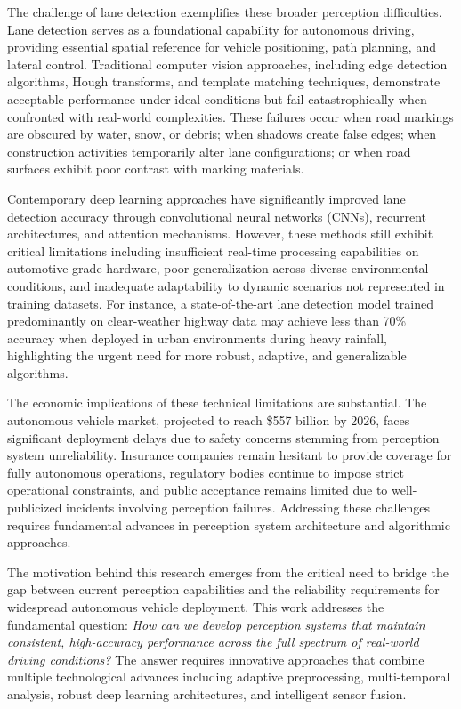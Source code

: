 The challenge of lane detection exemplifies these broader perception difficulties. Lane detection serves as a foundational capability for autonomous driving, providing essential spatial reference for vehicle positioning, path planning, and lateral control. Traditional computer vision approaches, including edge detection algorithms, Hough transforms, and template matching techniques, demonstrate acceptable performance under ideal conditions but fail catastrophically when confronted with real-world complexities. These failures occur when road markings are obscured by water, snow, or debris; when shadows create false edges; when construction activities temporarily alter lane configurations; or when road surfaces exhibit poor contrast with marking materials.

Contemporary deep learning approaches have significantly improved lane detection accuracy through convolutional neural networks (CNNs), recurrent architectures, and attention mechanisms. However, these methods still exhibit critical limitations including insufficient real-time processing capabilities on automotive-grade hardware, poor generalization across diverse environmental conditions, and inadequate adaptability to dynamic scenarios not represented in training datasets. For instance, a state-of-the-art lane detection model trained predominantly on clear-weather highway data may achieve less than 70\% accuracy when deployed in urban environments during heavy rainfall, highlighting the urgent need for more robust, adaptive, and generalizable algorithms.

The economic implications of these technical limitations are substantial. The autonomous vehicle market, projected to reach \$557 billion by 2026, faces significant deployment delays due to safety concerns stemming from perception system unreliability. Insurance companies remain hesitant to provide coverage for fully autonomous operations, regulatory bodies continue to impose strict operational constraints, and public acceptance remains limited due to well-publicized incidents involving perception failures. Addressing these challenges requires fundamental advances in perception system architecture and algorithmic approaches.

The motivation behind this research emerges from the critical need to bridge the gap between current perception capabilities and the reliability requirements for widespread autonomous vehicle deployment. This work addresses the fundamental question: \textit{How can we develop perception systems that maintain consistent, high-accuracy performance across the full spectrum of real-world driving conditions?} The answer requires innovative approaches that combine multiple technological advances including adaptive preprocessing, multi-temporal analysis, robust deep learning architectures, and intelligent sensor fusion.

